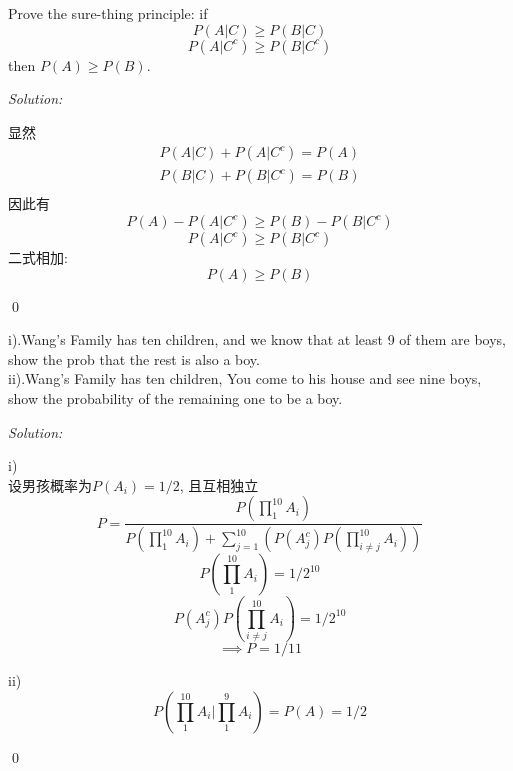 \documentclass[12pt]{article}
\newenvironment{problem}[2][Problem]{\begin{trivlist}
\item[\hskip \labelsep {\bfseries #1}\hskip \labelsep {\bfseries #2.}]}{\end{trivlist}}
\newenvironment{sol}
    {\emph{Solution:}
    }
    {
    \qed
    }
\newcommand\of[1]{\left( #1 \right)}                                  %
\newcommand{\f}[2]{\frac{#1}{#2}}                                      %
\newcommand\ip{\implies}                                               %
\newcommand{\ar}[2][rl]{\begin{array}{#1}                              %
            #2
        \end{array}}
\begin{document}




\begin{problem}{4}
Prove the sure-thing principle: if
$$P(A|C) \geq P(B|C)$$
$$P(A|C^{c}) \geq P(B|C^{c})$$
then $P (A) \geq P (B)$.
\end{problem}
\begin{sol}
显然
$$\ar{
    P(A|C) + P(A|C^c) = P(A)\\
    P(B|C) + P(B|C^c) = P(B)\\
}$$
因此有
$$P(A) - P(A|C^c) \geq P(B) - P(B|C^c)$$
$$P(A|C^{c}) \geq P(B|C^{c})$$
二式相加: 
$$P (A) \geq P (B)$$
\end{sol}



\begin{problem}{5}
i).Wang's Family has ten children, and we know that at least 9 of them are boys, show the prob that the rest is also a boy.\\
ii).Wang's Family has ten children, You come to his house and see nine boys, show the probability of the remaining one to be a boy.
\end{problem}
\begin{sol}

    i)\\
设男孩概率为$P(A_i)=1/2$, 且互相独立
$$P = \f{P(\prod_{1}^{10} A_i)}{P(\prod_{1}^{10} A_i) +\sum_{j=1}^{10}\of{P(A_j^c)P(\prod_{i\neq j}^{10} A_i)}}$$
$$P(\prod_{1}^{10} A_i) = 1/2^{10}$$
$$P(A_j^c)P(\prod_{i\neq j}^{10} A_i) =1/2^{10} $$
$$\ip P=1/11$$

    ii)\\
$$P(\prod_{1}^{10} A_i|\prod_{1}^9 A_i) = P(A) =1/2$$


\end{sol}
\end{document}
